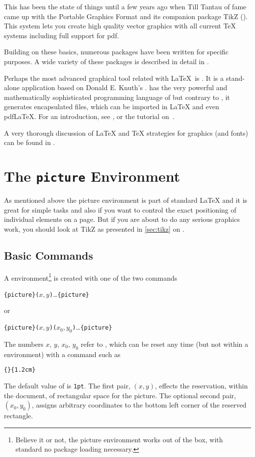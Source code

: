 This has been the state of things until a few years ago when Till Tantau of
 fame came up with the Portable Graphics Format  and its
companion package TikZ (). This system lets you create high
quality vector graphics with all current \TeX{} systems including full
support for pdf.

Building on these basics, numerous packages have been written for specific
purposes. A wide variety of these packages is described in detail in
\graphicscompanion{}.

Perhaps the most advanced graphical tool related with \LaTeX\ is . It is a stand-alone application
based on Donald E. Knuth's .  has the very powerful and
mathematically sophisticated programming language of  but contrary to ,
it generates encapsulated \PSi{} files,
which can be imported in \LaTeX{} and even pdf\LaTeX{}. For an introduction, see \hobby, or the tutorial on~\cite{ursoswald}.

A very thorough discussion of \LaTeX{} and \TeX{} strategies for graphics (and fonts) can
be found in \hoenig.

\section{The \texttt{picture} Environment}

As mentioned above the picture environment is part of standard \LaTeX{} and it is great for simple tasks and also if you want
to control the exact positioning of individual elements on a page. But if you are about to do any serious graphics work, you should
look at TikZ as presented in \autoref{sec:tikz} on .

\subsection{Basic Commands}

A  environment\footnote{Believe it or not, the picture environment works out of the
  box, with standard \LaTeXe{} no package loading necessary.} is created with one of the two commands
\begin{lscommand}
  \verb|{picture}(|$x,y$\verb|)|\ldots{}\verb|{picture}|
\end{lscommand}
\noindent or
\begin{lscommand}
  \verb|{picture}(|$x,y$\verb|)(|$x_0,y_0$\verb|)|\ldots{}\verb|{picture}|
\end{lscommand}
The numbers $x,\,y,\,x_0,\,y_0$ refer to , which can be reset any time
(but not within a  environment) with a command such as
\begin{lscommand}
  \verb|{|\verb|}{1.2cm}|
\end{lscommand}
The default value of  is \texttt{1pt}. The first pair, $(x,y)$, effects
the reservation, within the document, of rectangular space for the picture. The optional
second pair, $(x_0,y_0)$, assigns arbitrary coordinates to the bottom left corner of the
reserved rectangle.

